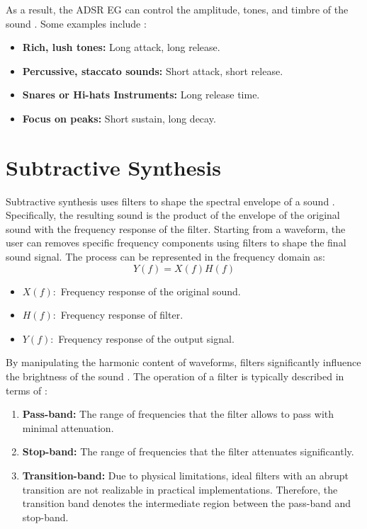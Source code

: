 \documentclass[12pt]{article}
\begin{document}
As a result, the ADSR EG can control the amplitude, tones, and timbre of the sound \cite{TTEM}. Some examples include \cite{MC}: 
\begin{itemize}
    \item \textbf{Rich, lush tones:} Long attack, long release. 
    \item \textbf{Percussive, staccato sounds:} Short attack, short release. 
    \item \textbf{Snares or Hi-hats Instruments:} Long release time.
    \item \textbf{Focus on peaks:} Short sustain, long decay.
\end{itemize}

\section{Subtractive Synthesis}
Subtractive synthesis uses filters to shape the spectral envelope of a sound \cite{TTEM}. Specifically, the resulting sound is the product of the envelope of the original sound with the frequency response of the filter. Starting from a waveform, the user can removes specific frequency components using filters to shape the final sound signal. The process can be represented in the frequency domain as:
\begin{equation}
    Y(f) = X(f) H(f)
\end{equation}
\begin{itemize}
    \item \( X(f): \) Frequency response of the original sound.
    \item \( H(f): \) Frequency response of filter.
    \item \( Y(f): \) Frequency response of the output signal.
\end{itemize}

By manipulating the harmonic content of waveforms, filters significantly influence the brightness of the sound \cite{MAMO}. The operation of a filter is typically described in terms of \cite{TTEM}:
\begin{enumerate}
    \item \textbf{Pass-band:} The range of frequencies that the filter allows to pass with minimal attenuation.
    \item \textbf{Stop-band:} The range of frequencies that the filter attenuates significantly.
    \item \textbf{Transition-band:} Due to physical limitations, ideal filters with an abrupt transition are not realizable in practical implementations. Therefore, the transition band denotes the intermediate region between the pass-band and stop-band. 
\end{enumerate}
\end{document}
